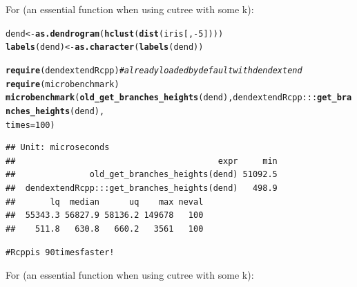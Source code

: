 \documentclass[shortnames,nojss,article]{jss}\usepackage[]{graphicx}\usepackage[]{color}
\makeatletter
\newcommand{\hlnum}[1]{\textcolor[rgb]{0.686,0.059,0.569}{#1}}%
\newcommand{\hlcom}[1]{\textcolor[rgb]{0.678,0.584,0.686}{\textit{#1}}}%
\newcommand{\hlopt}[1]{\textcolor[rgb]{0,0,0}{#1}}%
\newcommand{\hlstd}[1]{\textcolor[rgb]{0.345,0.345,0.345}{#1}}%
\newcommand{\hlkwb}[1]{\textcolor[rgb]{0.69,0.353,0.396}{#1}}%
\newcommand{\hlkwc}[1]{\textcolor[rgb]{0.333,0.667,0.333}{#1}}%
\newcommand{\hlkwd}[1]{\textcolor[rgb]{0.737,0.353,0.396}{\textbf{#1}}}%
\newenvironment{kframe}{%
 \def\at@end@of@kframe{}%
 \ifinner\ifhmode%
  \def\at@end@of@kframe{\end{minipage}}%
  \begin{minipage}{\columnwidth}%
 \fi\fi%
 \def\FrameCommand##1{\hskip\@totalleftmargin \hskip-\fboxsep
 \colorbox{shadecolor}{##1}\hskip-\fboxsep
     \hskip-\linewidth \hskip-\@totalleftmargin \hskip\columnwidth}%
 \MakeFramed {\advance\hsize-\width
   \@totalleftmargin\z@ \linewidth\hsize
   \@setminipage}}%
 {\par\unskip\endMakeFramed%
 \at@end@of@kframe}
\newenvironment{knitrout}{}{} %
\makeatother
\begin{document}
For  (an essential function when using cutree with some k):

\begin{knitrout}
\color{fgcolor}\begin{kframe}
\begin{alltt}
\hlstd{dend} \hlkwb{<-} \hlkwd{as.dendrogram}\hlstd{(}\hlkwd{hclust}\hlstd{(}\hlkwd{dist}\hlstd{(iris[,} \hlopt{-}\hlnum{5}\hlstd{])))}
\hlkwd{labels}\hlstd{(dend)} \hlkwb{<-} \hlkwd{as.character}\hlstd{(}\hlkwd{labels}\hlstd{(dend)}\hlstd{)}

\hlkwd{require}\hlstd{(dendextendRcpp)}  \hlcom{# already loaded by default with dendextend}
\hlkwd{require}\hlstd{(microbenchmark)}
\hlkwd{microbenchmark}\hlstd{(}\hlkwd{old_get_branches_heights}\hlstd{(dend), dendextendRcpp:::}\hlkwd{get_branches_heights}\hlstd{(dend),}
    \hlkwc{times} \hlstd{=} \hlnum{100}\hlstd{)}
\end{alltt}
\begin{verbatim}
## Unit: microseconds
##                                         expr     min
##               old_get_branches_heights(dend) 51092.5
##  dendextendRcpp:::get_branches_heights(dend)   498.9
##       lq  median      uq    max neval
##  55343.3 56827.9 58136.2 149678   100
##    511.8   630.8   660.2   3561   100
\end{verbatim}
\begin{alltt}
# Rcpp is ~90 times faster!
\end{alltt}
\end{kframe}
\end{knitrout}


For  (an essential function when using cutree with some k):
\end{document}
